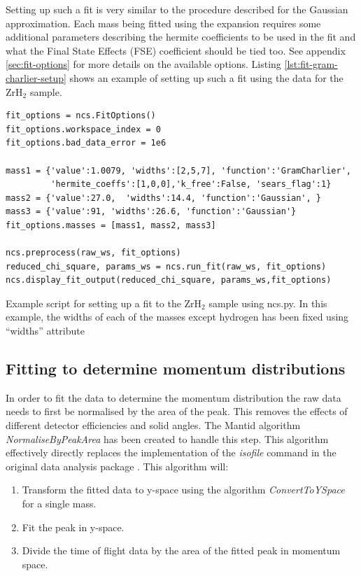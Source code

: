 \documentclass[paper=a4, fontsize=11pt]{scrartcl}	%
\numberwithin{equation}{section}															%
\numberwithin{figure}{section}																%
\numberwithin{table}{section}
\begin{document}
Setting up such a fit is very similar to the procedure described for the Gaussian approximation. Each mass being fitted using the expansion requires some additional parameters describing the hermite coefficients to be used in the fit and what the Final State Effects (FSE) coefficient should be tied too. See appendix \ref{sec:fit-options} for more details on the available options. Listing \ref{lst:fit-gram-charlier-setup} shows an example of setting up such a fit using the data for the ZrH$_2$ sample.

\begin{listing}[H]
\begin{verbatim}
fit_options = ncs.FitOptions()
fit_options.workspace_index = 0
fit_options.bad_data_error = 1e6

mass1 = {'value':1.0079, 'widths':[2,5,7], 'function':'GramCharlier', 
         'hermite_coeffs':[1,0,0],'k_free':False, 'sears_flag':1}
mass2 = {'value':27.0,  'widths':14.4, 'function':'Gaussian', }
mass3 = {'value':91, 'widths':26.6, 'function':'Gaussian'}
fit_options.masses = [mass1, mass2, mass3]

ncs.preprocess(raw_ws, fit_options)
reduced_chi_square, params_ws = ncs.run_fit(raw_ws, fit_options)
ncs.display_fit_output(reduced_chi_square, params_ws,fit_options)
\end{verbatim}
\caption{Example script for setting up a fit to the ZrH$_2$ sample using ncs.py. In this example, the widths of each of the masses except hydrogen has been fixed using ``widths'' attribute}
\label{lst:fit-gram-charlier-setup}
\end{listing}


\subsection{Fitting to determine momentum distributions}
\label{subsec:fitting-momentum-distributions}
In order to fit the data to determine the momentum distribution the raw data needs to first be normalised by the area of the peak. This removes the effects of different detector efficiencies and solid angles. The Mantid algorithm \textit{NormaliseByPeakArea} has been created to handle this step. This algorithm effectively directly replaces the implementation of the \textit{isofile} command in the original data analysis package \cite{mayers2010user}. This algorithm will:

\begin{enumerate}
\item Transform the fitted data to y-space using the algorithm \textit{ConvertToYSpace} for a single mass.
\item Fit the peak in y-space.
\item Divide the time of flight data by the area of the fitted peak in momentum space.
\end{enumerate}
\end{document}
